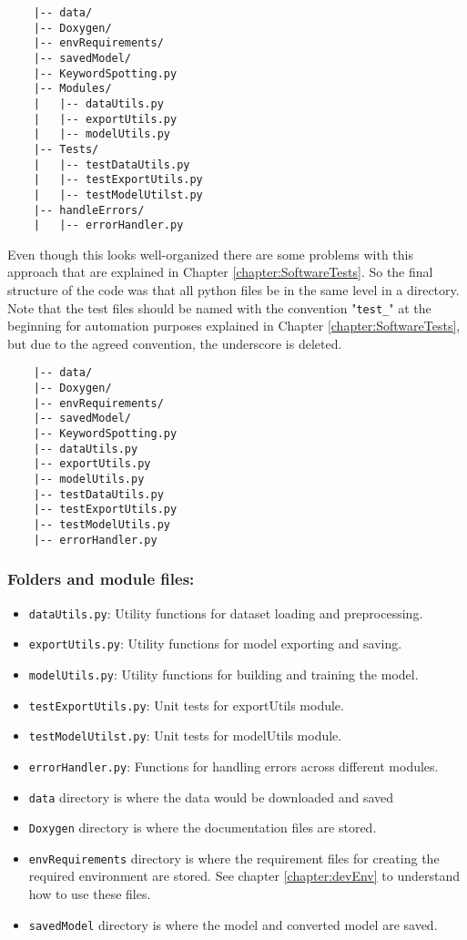 \begin{verbatim}
	|-- data/
	|-- Doxygen/
	|-- envRequirements/
	|-- savedModel/
	|-- KeywordSpotting.py
	|-- Modules/
	|   |-- dataUtils.py
	|   |-- exportUtils.py
	|   |-- modelUtils.py
	|-- Tests/
	|   |-- testDataUtils.py
	|   |-- testExportUtils.py
	|   |-- testModelUtilst.py
	|-- handleErrors/
	|   |-- errorHandler.py
\end{verbatim}

Even though this looks well-organized there are some problems with this approach that are explained in Chapter \ref{chapter:SoftwareTests}. So the final structure of the code was that all python files be in the same level in a directory. Note that the test files should be named with the convention "\texttt{test\_}" at the beginning for automation purposes explained in Chapter \ref{chapter:SoftwareTests}, but due to the agreed convention, the underscore is deleted.

\begin{verbatim}
	|-- data/
	|-- Doxygen/
	|-- envRequirements/
	|-- savedModel/
	|-- KeywordSpotting.py
	|-- dataUtils.py
	|-- exportUtils.py
	|-- modelUtils.py
	|-- testDataUtils.py
	|-- testExportUtils.py
	|-- testModelUtils.py
	|-- errorHandler.py
\end{verbatim}

\subsubsection{Folders and module files:}

\begin{itemize}
	\item \texttt{dataUtils.py}: Utility functions for dataset loading and preprocessing.
	\item \texttt{exportUtils.py}: Utility functions for model exporting and saving.
	\item \texttt{modelUtils.py}: Utility functions for building and training the model.
	\item \texttt{testExportUtils.py}: Unit tests for exportUtils module.
	\item \texttt{testModelUtilst.py}: Unit tests for modelUtils module.
	\item \texttt{errorHandler.py}: Functions for handling errors across different modules.
	\item \texttt{data} directory is where the data would be downloaded and saved
	\item \texttt{Doxygen} directory is where the documentation files are stored.
	\item \texttt{envRequirements} directory is where the requirement files for creating the required environment are stored. See chapter \ref{chapter:devEnv} to understand how to use these files.
	\item \texttt{savedModel} directory is where the model and converted model are saved.
\end{itemize}

